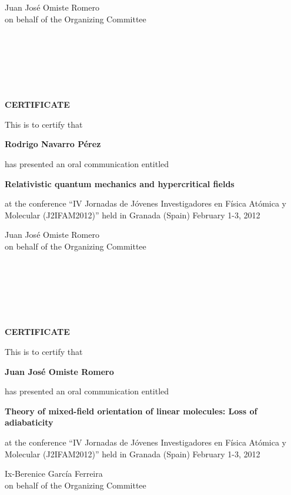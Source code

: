 \documentclass [13pt,a4paper] {letter}
\begin{document}
\vspace {3cm}
\begin{raggedleft}
Juan José Omiste Romero\\
on behalf of the Organizing Committee
\newpage
\end{raggedleft}
\begin{verbatim}






\end{verbatim}
\pagestyle{empty}
\begin{center}
{\bf {\Huge CERTIFICATE}}

\vspace {1.5cm}
This is to certify that
\vspace {1cm}

{\bf \Large  Rodrigo    Navarro Pérez }
\vspace {1cm}

has presented an oral communication entitled
\vspace {1cm}

{\bf \large  Relativistic quantum mechanics and hypercritical fields }
\vspace {1cm}

at the conference { \textquotedblleft IV Jornadas de Jóvenes Investigadores en Física Atómica y Molecular (J2IFAM2012)\textquotedblright} 
held in Granada (Spain) February 1-3, 2012
\end{center}
\vspace {3cm}
\begin{raggedleft}
Juan José Omiste Romero\\
on behalf of the Organizing Committee
\newpage
\end{raggedleft}
\begin{verbatim}






\end{verbatim}
\pagestyle{empty}
\begin{center}
{\bf {\Huge CERTIFICATE}}

\vspace {1.5cm}
This is to certify that
\vspace {1cm}

{\bf \Large  Juan   José  Omiste Romero }
\vspace {1cm}

has presented an oral communication entitled
\vspace {1cm}

{\bf \large  Theory of mixed-field orientation of linear molecules: Loss of adiabaticity }
\vspace {1cm}

at the conference { \textquotedblleft IV Jornadas de Jóvenes Investigadores en Física Atómica y Molecular (J2IFAM2012)\textquotedblright} 
held in Granada (Spain) February 1-3, 2012
\end{center}
\vspace {3cm}
\begin{raggedleft}
Ix-Berenice García Ferreira\\
on behalf of the Organizing Committee
\newpage
\end{raggedleft}
\end{document}
